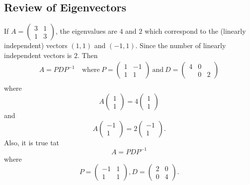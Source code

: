 \subsection{Review of Eigenvectors}

\begin{eg}
    If \( A = \begin{pmatrix} 3 & 1 \\ 1 & 3  \end{pmatrix}  \), the eigenvalues are \( 4  \) and \( 2  \) which correspond to the (linearly independent) vectors \( (1,1) \) and \( (-1,1) \). Since the number of linearly independent vectors is \( 2 \). Then 
    \begin{align*}
        A = P D P^{-1} \  &\text{where} \ P = \begin{pmatrix} 1 & - 1 \\ 1 & 1  \end{pmatrix} \ \text{and} \ D = \begin{pmatrix} 4 & 0 \\ & 0 & 2  \end{pmatrix}   \\
    \end{align*}
    where 
    \[  A \begin{pmatrix}  1 \\ 1  \end{pmatrix}  = 4 \begin{pmatrix}  1 \\ 1  \end{pmatrix}  \] and
    \[  A \begin{pmatrix} - 1 \\ 1  \end{pmatrix}  = 2 \begin{pmatrix}  - 1 \\ 1  \end{pmatrix}. \]
    Also, it is true tat 
    \[  A = P D P^{-1} \]
    where
    \[  P = \begin{pmatrix}  - 1 & 1 \\ 1 & 1  \end{pmatrix} , D = \begin{pmatrix} 2 & 0 \\ 0 & 4  \end{pmatrix}. \]
\end{eg}


